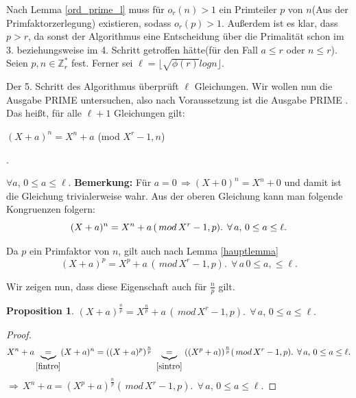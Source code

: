 \documentclass[12pt,oneside]{article}
\newtheorem{prop}{Proposition}[section]
\theoremstyle{remark}
\theoremstyle{definition}
\begin{document}
\smallskip

Nach Lemma \ref{ord_prime_l} muss für  $o_{r}(n) > 1$ ein Primteiler $p$ von $n$(Aus der Primfaktorzerlegung) existieren, sodass $o_{r}(p) > 1$. Außerdem ist es klar, dass $p > r$, da sonst der Algorithmus eine Entscheidung über die Primalität schon im 3. beziehungsweise im 4. Schritt getroffen hätte(für den Fall $a \leq r$ oder $n \leq r$). Seien $p,n \in \mathbb{Z}_{r}^{*}$ fest. Ferner sei  $\ell = \lfloor \sqrt{\phi(r)} log n \rfloor$.\newline\newline

Der 5. Schritt des Algorithmus überprüft $\ell$ Gleichungen. Wir wollen nun die Ausgabe PRIME untersuchen, also nach Voraussetzung ist die Ausgabe PRIME . Das heißt, für alle  $\ell + 1$  Gleichungen gilt:\newline\newline
\centerline{$(X + a)^n = X^n + a $ (mod $X^r - 1, n$)}.

$\forall a$, $ 0 \leq a \leq \ell$.\newline\newline
\textbf{Bemerkung:} Für $a = 0 \,  \Rightarrow (X + 0)^n = X^n + 0$ und damit ist die Gleichung trivialerweise wahr.\newline\newline 
Aus der oberen Gleichung kann man folgende Kongruenzen folgern:
\begin{equation}\label{fintro}
(X + a)^n = X^n + a \, (\, mod \, X^r - 1, p).
\; \, \forall\,a, \, 0 \leq a \leq \ell.\newline\newline
\end{equation}

Da $p$ ein Primfaktor von $n$, gilt auch nach Lemma \ref{hauptlemma} \newline
\begin{equation}\label{sintro}
    (X + a)^p = X^p + a \, (\, mod \, X^r - 1, p). \; \, \forall\,a \, 0 \leq a, \leq \ell.
\end{equation}

Wir zeigen nun, dass diese Eigenschaft auch für $\frac{n}{p}$ gilt.\newline

\begin{prop}
$(X + a)^{\frac{n}{p}} = X^{\frac{n}{p}} + a \, (\, mod \, X^r -1,p). \; \, \forall\,a, \,  0 \leq a \leq \ell.$
\end{prop}

\begin{proof}
\begin{align*}
    X^{n} + a \underbrace{=}_{\ref{fintro}} (X + a)^n = ((X + a)^{p})^{\frac{n}{p}} \; \underbrace{=}_{\ref{sintro}} \; ((X^{p} + a))^{\frac{n}{p}} (\, mod \, X^r - 1,p). \; \, \forall\,a, \, 0 \leq a \leq \ell.
\end{align*}
$\Rightarrow \, X^{n} + a = (X^{p} + a)^{\frac{n}{p}} (\, mod \, X^r - 1,p). \; \, \forall\,a, \, 0 \leq a \leq \ell.$
\end{proof}
\end{document}
